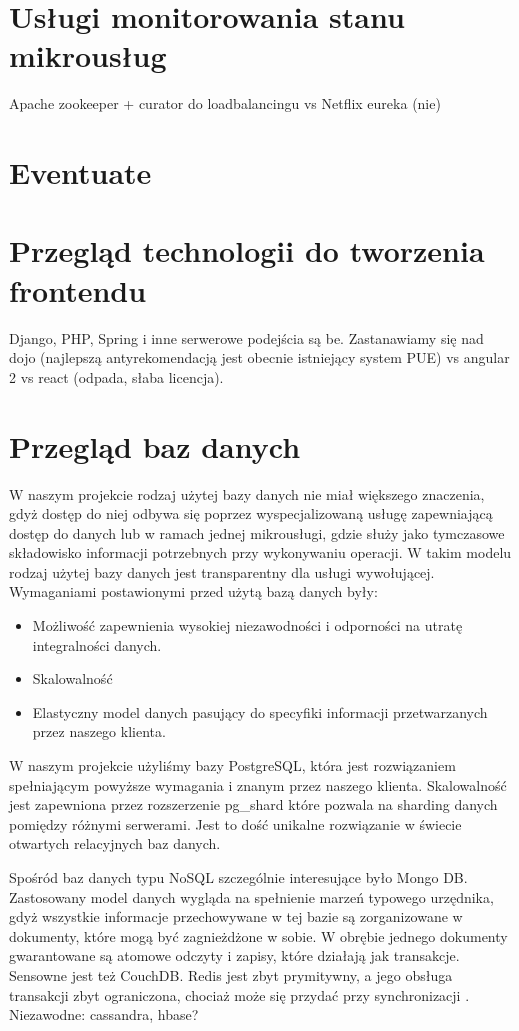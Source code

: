\documentclass[licencjacka]{pracamgr}
\begin{document}
\section{Usługi monitorowania stanu mikrousług}
Apache zookeeper + curator do loadbalancingu vs Netflix eureka (nie) %

\section{Eventuate}

\section{Przegląd technologii do tworzenia frontendu}
Django, PHP, Spring i inne serwerowe podejścia są be. Zastanawiamy się nad dojo (najlepszą antyrekomendacją jest obecnie istniejący system PUE) vs angular 2 vs react (odpada, słaba licencja).

\section{Przegląd baz danych}

W naszym projekcie rodzaj użytej bazy danych nie miał większego znaczenia, gdyż dostęp do niej odbywa się poprzez
wyspecjalizowaną usługę zapewniającą dostęp do danych lub w ramach jednej mikrousługi, gdzie służy jako tymczasowe
składowisko informacji potrzebnych przy wykonywaniu operacji. W takim modelu rodzaj użytej bazy danych jest
transparentny dla usługi wywołującej.
Wymaganiami postawionymi przed użytą bazą danych były:
\begin{itemize}
\item Możliwość zapewnienia wysokiej niezawodności i odporności na utratę integralności danych.
\item Skalowalność
\item Elastyczny model danych pasujący do specyfiki informacji przetwarzanych przez naszego klienta.
\end{itemize}
W naszym projekcie użyliśmy bazy PostgreSQL, która jest rozwiązaniem spełniającym powyższe wymagania i znanym przez naszego klienta. Skalowalność jest zapewniona przez rozszerzenie pg\_shard które pozwala na sharding danych pomiędzy różnymi serwerami. Jest to dość unikalne rozwiązanie w świecie otwartych relacyjnych baz danych.

Spośród baz danych typu NoSQL szczególnie interesujące było Mongo DB. Zastosowany model danych wygląda na spełnienie
marzeń typowego urzędnika, gdyż wszystkie informacje przechowywane w tej bazie są zorganizowane w dokumenty,
które mogą być zagnieżdżone w sobie. W obrębie jednego dokumenty gwarantowane są atomowe odczyty i zapisy, które
działają jak transakcje.
Sensowne jest też CouchDB. Redis jest zbyt prymitywny, a jego obsługa transakcji zbyt ograniczona, chociaż
może się przydać przy synchronizacji \cite{redislock}. Niezawodne: cassandra, hbase?
\end{document}
